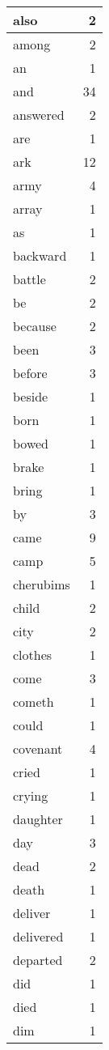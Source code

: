 \begin{center}
\begin{longtable}{l|r}
also & 2 \\ \hline
among & 2 \\ \hline
an & 1 \\ \hline
and & 34 \\ \hline
answered & 2 \\ \hline
are & 1 \\ \hline
ark & 12 \\ \hline
army & 4 \\ \hline
array & 1 \\ \hline
as & 1 \\ \hline
backward & 1 \\ \hline
battle & 2 \\ \hline
be & 2 \\ \hline
because & 2 \\ \hline
been & 3 \\ \hline
before & 3 \\ \hline
beside & 1 \\ \hline
born & 1 \\ \hline
bowed & 1 \\ \hline
brake & 1 \\ \hline
bring & 1 \\ \hline
by & 3 \\ \hline
came & 9 \\ \hline
camp & 5 \\ \hline
cherubims & 1 \\ \hline
child & 2 \\ \hline
city & 2 \\ \hline
clothes & 1 \\ \hline
come & 3 \\ \hline
cometh & 1 \\ \hline
could & 1 \\ \hline
covenant & 4 \\ \hline
cried & 1 \\ \hline
crying & 1 \\ \hline
daughter & 1 \\ \hline
day & 3 \\ \hline
dead & 2 \\ \hline
death & 1 \\ \hline
deliver & 1 \\ \hline
delivered & 1 \\ \hline
departed & 2 \\ \hline
did & 1 \\ \hline
died & 1 \\ \hline
dim & 1 \\ \hline

\end{longtable}
\end{center}

